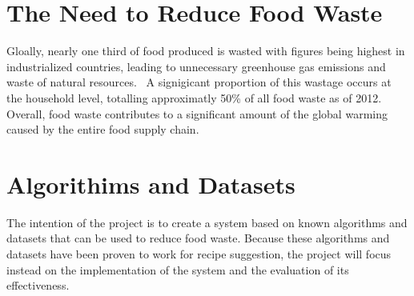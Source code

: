 
{
\let\clearpage\relax

\section{The Need to Reduce Food Waste}
Gloally, nearly one third of food produced is wasted with figures being highest
in industrialized countries, leading to unnecessary greenhouse gas emissions and
waste of natural resources.~\cite{gustavsson_global_2011} A signigicant proportion
of this wastage occurs at the household level, totalling approximatly 50\% of all
food waste as of 2012.~\cite{stenmarck_estimates_2016} Overall, food waste contributes
to a significant amount of the global warming caused by the entire food supply
chain.~\cite{scherhaufer_environmental_2018}

\section{Algorithims and Datasets}
The intention of the project is to create a system based on known algorithms and
datasets that can be used to reduce food waste. Because these algorithms and
datasets have been proven to work for recipe suggestion, the project will focus
instead on the implementation of the system and the evaluation of its effectiveness.

} %
